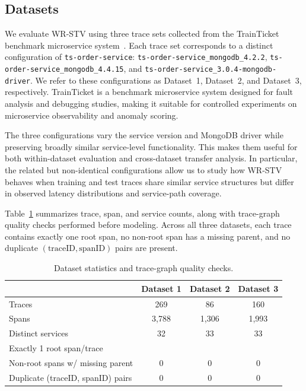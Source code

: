 \documentclass[informatics,article,submit,moreauthors]{Definitions/mdpi}
\begin{document}
\subsection{Datasets}

We evaluate WR-STV using three trace sets collected from the
TrainTicket benchmark microservice system~\cite{zhou2021trainticket}.
Each trace set corresponds to a distinct configuration of
\texttt{ts-order-service}:
\texttt{ts-order-service\_mongodb\_4.2.2},
\texttt{ts-order-service\_mongodb\_4.4.15}, and
\texttt{ts-order-service\_3.0.4-mongodb-driver}. We refer to these
configurations as Dataset~1, Dataset~2, and Dataset~3, respectively.
TrainTicket is a benchmark microservice system designed for fault
analysis and debugging studies, making it suitable for controlled
experiments on microservice observability and anomaly scoring.

The three configurations vary the service version and MongoDB driver
while preserving broadly similar service-level functionality. This makes
them useful for both within-dataset evaluation and cross-dataset transfer
analysis. In particular, the related but non-identical configurations
allow us to study how WR-STV behaves when training and test traces share
similar service structures but differ in observed latency distributions
and service-path coverage.

Table~\ref{tab:dataset-stats} summarizes trace, span, and service
counts, along with trace-graph quality checks performed before modeling.
Across all three datasets, each trace contains exactly one root span, no
non-root span has a missing parent, and no duplicate
\((\text{traceID}, \text{spanID})\) pairs are present.

\begin{table}[t]
	\centering
	\caption{Dataset statistics and trace-graph quality checks.}
	\label{tab:dataset-stats}
	\begin{tabular}{lccc}
		\toprule
		& \textbf{Dataset 1} & \textbf{Dataset 2} & \textbf{Dataset 3} \\
		\midrule
		Traces          & 269 & 86  & 160 \\
		Spans           & 3{,}788 & 1{,}306 & 1{,}993 \\
		Distinct services & 32 & 33 & 33 \\
		\midrule
		Exactly 1 root span/trace & \checkmark & \checkmark & \checkmark \\
		Non-root spans w/ missing parent & 0 & 0 & 0 \\
		Duplicate (traceID, spanID) pairs & 0 & 0 & 0 \\
		\bottomrule
	\end{tabular}
\end{table}
\end{document}
